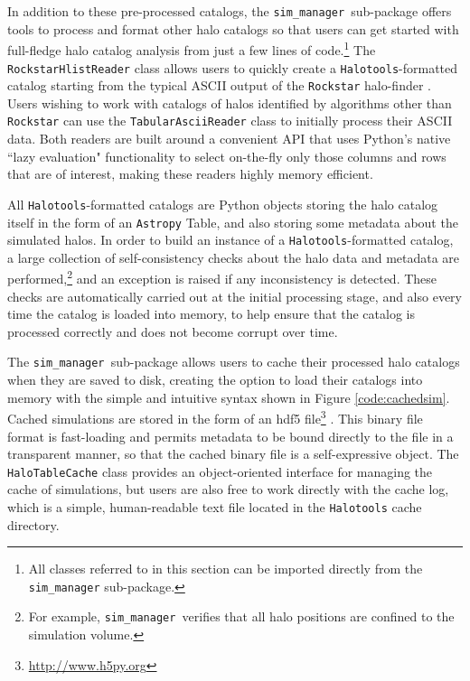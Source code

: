 \documentclass[twocolumn, tighten]{aastex6}
\newcommand{\sims}{{\tt sim\_manager }}
\begin{document}
In addition to these pre-processed catalogs, the \sims sub-package offers tools to process and format other halo catalogs so that users can get started with full-fledge halo catalog analysis from just a few lines of code.\footnote{All classes referred to in this section can be imported directly from the {\tt sim\_manager} sub-package.} The {\tt RockstarHlistReader} class allows users to quickly create a {\tt Halotools}-formatted catalog starting from the typical ASCII output of the {\tt Rockstar} halo-finder \citep{behroozi_rockstar11, rockstar_trees}. Users wishing to work with catalogs of halos identified by algorithms other than {\tt Rockstar} can use the {\tt TabularAsciiReader} class to initially process their ASCII data. Both readers are built around a convenient API that uses Python's native ``lazy evaluation" functionality to select on-the-fly only those columns and rows that are of interest, making these readers highly memory efficient.

All {\tt Halotools}-formatted catalogs are Python objects storing the halo catalog itself in the form of an {\tt Astropy} Table, and also storing some metadata about the simulated halos. In order to build an instance of a {\tt Halotools}-formatted catalog, a large collection of self-consistency checks about the halo data and metadata are performed,\footnote{For example, \sims verifies that all halo positions are confined to the simulation volume.} and an exception is raised if any inconsistency is detected. These checks are automatically carried out at the initial processing stage, and also every time the catalog is loaded into memory, to help ensure that the catalog is processed correctly and does not become corrupt over time.

The \sims sub-package allows users to cache their processed halo catalogs when they are saved to disk, creating the option to load their catalogs into memory with the simple and intuitive syntax shown in Figure \ref{code:cachedsim}. Cached simulations are stored in the form of an hdf5 file\footnote{\url{http://www.h5py.org}} \citep{hdf5}. This binary file format is fast-loading and permits metadata to be bound directly to the file in a transparent manner, so that the cached binary file is a self-expressive object. The {\tt HaloTableCache} class provides an object-oriented interface for managing the cache of simulations, but users are also free to work directly with the cache log, which is a simple, human-readable text file located in the {\tt Halotools} cache directory.
\end{document}
